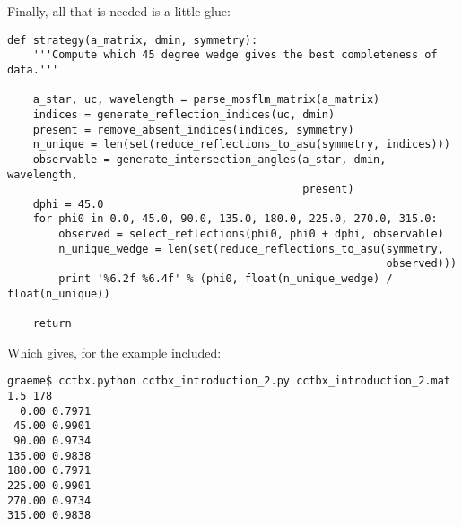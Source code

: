\documentclass[a4paper, 11pt]{article}
\begin{document}
Finally, all that is needed is a little glue:

{\small
\begin{verbatim}
def strategy(a_matrix, dmin, symmetry):
    '''Compute which 45 degree wedge gives the best completeness of data.'''

    a_star, uc, wavelength = parse_mosflm_matrix(a_matrix)
    indices = generate_reflection_indices(uc, dmin)
    present = remove_absent_indices(indices, symmetry)
    n_unique = len(set(reduce_reflections_to_asu(symmetry, indices)))
    observable = generate_intersection_angles(a_star, dmin, wavelength,
                                              present)
    dphi = 45.0
    for phi0 in 0.0, 45.0, 90.0, 135.0, 180.0, 225.0, 270.0, 315.0:
        observed = select_reflections(phi0, phi0 + dphi, observable)
        n_unique_wedge = len(set(reduce_reflections_to_asu(symmetry,
                                                           observed)))
        print '%6.2f %6.4f' % (phi0, float(n_unique_wedge) / float(n_unique))

    return
\end{verbatim}
}

Which gives, for the example included:

{\small
\begin{verbatim}
graeme$ cctbx.python cctbx_introduction_2.py cctbx_introduction_2.mat 1.5 178 
  0.00 0.7971
 45.00 0.9901
 90.00 0.9734
135.00 0.9838
180.00 0.7971
225.00 0.9901
270.00 0.9734
315.00 0.9838
\end{verbatim}
}
\end{document}
